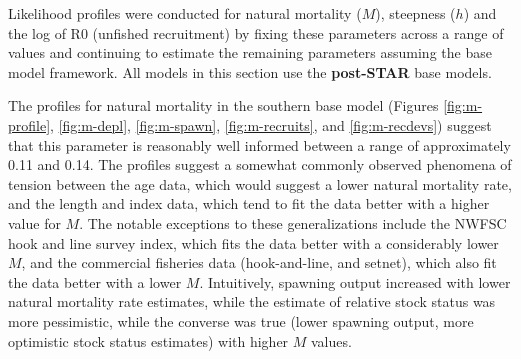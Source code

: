 \documentclass[11pt,
  english,
]{article}
\begin{document}
Likelihood profiles were conducted for natural mortality ({\(M\)\leavevmode\tagmcend\tagstructend}), steepness ({\(h\)\leavevmode\tagmcend\tagstructend}) and the log of R0 (unfished recruitment) by fixing these parameters across a range of values and continuing to estimate the remaining parameters assuming the base model framework. All models in this section use the \textbf{post-STAR} base models.

The profiles for natural mortality in the southern base model (Figures \ref{fig:m-profile}, \ref{fig:m-depl}, \ref{fig:m-spawn}, \ref{fig:m-recruits}, and \ref{fig:m-recdevs}) suggest that this parameter is reasonably well informed between a range of approximately 0.11 and 0.14. The profiles suggest a somewhat commonly observed phenomena of tension between the age data, which would suggest a lower natural mortality rate, and the length and index data, which tend to fit the data better with a higher value for {\(M\)\leavevmode\tagmcend\tagstructend}. The notable exceptions to these generalizations include the NWFSC hook and line survey index, which fits the data better with a considerably lower {\(M\)\leavevmode\tagmcend\tagstructend}, and the commercial fisheries data (hook-and-line, and setnet), which also fit the data better with a lower {\(M\)\leavevmode\tagmcend\tagstructend}. Intuitively, spawning output increased with lower natural mortality rate estimates, while the estimate of relative stock status was more pessimistic, while the converse was true (lower spawning output, more optimistic stock status estimates) with higher {\(M\)\leavevmode\tagmcend\tagstructend} values.
\end{document}
